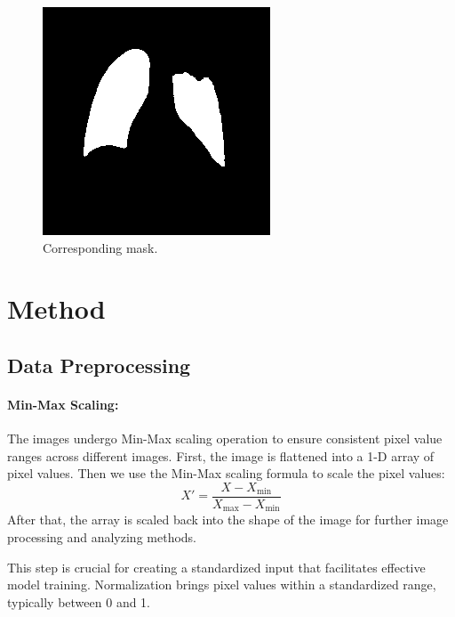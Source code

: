 \documentclass[]{acmsiggraph}
\begin{document}
\begin{figure}[h]\centering
 \includegraphics[width=0.75\linewidth]{images/covid_1_mask.png}
 \caption{\label{fig:reference}Corresponding mask.}
\end{figure}

\section{Method}
\subsection{Data Preprocessing}
\paragraph{Min-Max Scaling:}
The images undergo Min-Max scaling operation to ensure consistent pixel value ranges across different images. First, the image is flattened into a 1-D array of pixel values. Then we use the Min-Max scaling formula to scale the pixel values:
\[
X' = \frac{X - X_{\text{min}}}{X_{\text{max}} - X_{\text{min}}}
\]
After that, the array is scaled back into the shape of the image for further image processing and analyzing methods.

This step is crucial for creating a standardized input that facilitates effective model training. Normalization brings pixel values within a standardized range, typically between 0 and 1.
\end{document}

